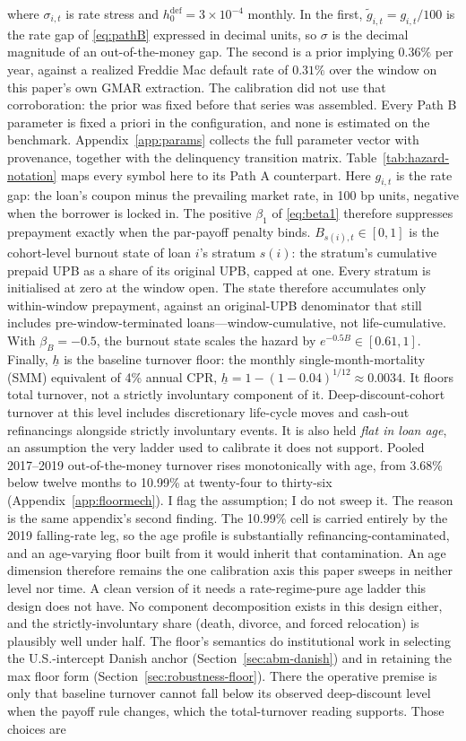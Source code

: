 \documentclass[12pt]{article}
\begin{document}
where $\sigma_{i,t}$ is rate stress and $h^{\mathrm{def}}_0 = 3\times10^{-4}$ monthly. In the first, $\tilde g_{i,t} = g_{i,t}/100$ is the rate gap of \eqref{eq:pathB} expressed in decimal units, so $\sigma$ is the decimal magnitude of an out-of-the-money gap. The second is a prior implying $0.36\%$ per year, against a realized Freddie Mac default rate of $0.31\%$ over the window on this paper's own GMAR extraction. The calibration did not use that corroboration: the prior was fixed before that series was assembled. Every Path B parameter is fixed a priori in the configuration, and none is estimated on the benchmark. Appendix~\ref{app:params} collects the full parameter vector with provenance, together with the delinquency transition matrix. Table~\ref{tab:hazard-notation} maps every symbol here to its Path A counterpart. Here $g_{i,t}$ is the rate gap: the loan's coupon minus the prevailing market rate, in 100 bp units, negative when the borrower is locked in. The positive $\beta_1$ of \eqref{eq:beta1} therefore suppresses prepayment exactly when the par-payoff penalty binds. $B_{s(i),t} \in [0,1]$ is the cohort-level burnout state of loan $i$'s stratum $s(i)$: the stratum's cumulative prepaid UPB as a share of its original UPB, capped at one. Every stratum is initialised at zero at the window open. The state therefore accumulates only within-window prepayment, against an original-UPB denominator that still includes pre-window-terminated loans---window-cumulative, not life-cumulative. With $\beta_B = -0.5$, the burnout state scales the hazard by $e^{-0.5 B} \in [0.61, 1]$. Finally, $\underline{h}$ is the baseline turnover floor: the monthly single-month-mortality (SMM) equivalent of 4\% annual CPR, $\underline{h} = 1-(1-0.04)^{1/12} \approx 0.0034$. It floors total turnover, not a strictly involuntary component of it. Deep-discount-cohort turnover at this level includes discretionary life-cycle moves and cash-out refinancings alongside strictly involuntary events. It is also held \emph{flat in loan age}, an assumption the very ladder used to calibrate it does not support. Pooled 2017--2019 out-of-the-money turnover rises monotonically with age, from 3.68\% below twelve months to 10.99\% at twenty-four to thirty-six (Appendix~\ref{app:floormech}). I flag the assumption; I do not sweep it. The reason is the same appendix's second finding. The 10.99\% cell is carried entirely by the 2019 falling-rate leg, so the age profile is substantially refinancing-contaminated, and an age-varying floor built from it would inherit that contamination. An age dimension therefore remains the one calibration axis this paper sweeps in neither level nor time. A clean version of it needs a rate-regime-pure age ladder this design does not have. No component decomposition exists in this design either, and the strictly-involuntary share (death, divorce, and forced relocation) is plausibly well under half. The floor's semantics do institutional work in selecting the U.S.-intercept Danish anchor (Section~\ref{sec:abm-danish}) and in retaining the max floor form (Section~\ref{sec:robustness-floor}). There the operative premise is only that baseline turnover cannot fall below its observed deep-discount level when the payoff rule changes, which the total-turnover reading supports. Those choices are 
\end{document}
